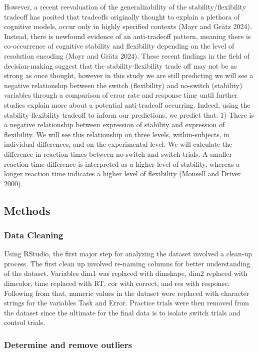 \documentclass[
  11pt,
]{article}
\begin{document}
However, a recent reevaluation of the generalizability of the
stability/flexibility tradeoff has posited that tradeoffs originally
thought to explain a plethora of cognitive models, occur only in highly
specified contexts (Mayr and Grätz 2024). Instead, there is newfound
evidence of an anti-tradeoff pattern, meaning there is co-occurrence of
cognitive stability and flexibility depending on the level of resolution
encoding (Mayr and Grätz 2024). These recent findings in the field of
decision-making suggest that the stability-flexibility trade off may not
be as strong as once thought, however in this study we are still
predicting we will see a negative relationship between the switch
(flexibility) and no-switch (stability) variables through a comparison
of error rate and response time until further studies explain more about
a potential anti-tradeoff occurring. Indeed, using the
stability-flexibility tradeoff to inform our predictions, we predict
that: 1) There is a negative relationship between expression of
stability and expression of flexibility. We will see this relationship
on three levels, within-subjects, in individual differences, and on the
experimental level. We will calculate the difference in reaction times
between no-switch and switch trials. A smaller reaction time difference
is interpreted as a higher level of stability, whereas a longer reaction
time indicates a higher level of flexibility (Monsell and Driver 2000).

\subsection{Methods}\label{methods}

\subsubsection{Data Cleaning}\label{data-cleaning}

Using RStudio, the first major step for analyzing the dataset involved a
clean-up process. The first clean up involved re-naming columns for
better understanding of the dataset. Variables dim1 was replaced with
dimshape, dim2 replaced with dimcolor, time replaced with RT, cor with
correct, and res with response. Following from that, numeric values in
the dataset were replaced with character strings for the variables Task
and Error. Practice trials were then removed from the dataset since the
ultimate for the final data is to isolate switch trials and control
trials.

\subsubsection{Determine and remove
outliers}\label{determine-and-remove-outliers}
\end{document}

